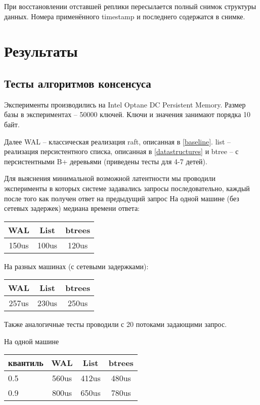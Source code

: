 \documentclass[pdftex,ptm,12pt,a4paper]{report}
\theoremstyle{definition}
\begin{document}
При восстановлении отставшей реплики пересылается полный снимок структуры данных. Номера применённого timestamp и последнего содержатся в снимке.

\chapter{Результаты}
\section{Тесты алгоритмов консенсуса}
Эксперименты производились на Intel Optane DC Persistent Memory.
Размер базы в экспериментах -- 50000 ключей. Ключи и значения занимают порядка 10 байт.

Далее  WAL -- классическая реализация raft, описанная в \ref{baseline}. list -- реализация персистентного списка, описанная в \ref{datastructures}
и btree -- с персистентными B+ деревьями (приведены тесты для 4-7 детей).

Для выяснения минимальной возможной латентности мы проводили эксперименты в которых системе задавались запросы последовательно, каждый после того как получен ответ на предыдущий запрос
На одной машине (без сетевых задержек) медиана времени ответа:
\begin{center}
\begin{tabular} {|c c c|}
\hline
    WAL & List & btrees \\
    \hline
150us & 100us & 120us \\
\hline
\end{tabular}
\end{center}

На разных машинах (с сетевыми задержками):
\begin{center}
\begin{tabular} {|c c c|}
\hline
    WAL & List & btrees \\
    \hline
257us & 230us & 250us \\
\hline
\end{tabular}
\end{center}

Также аналогичные тесты проводили с 20 потоками задающими запрос.

На одной машине

\begin{center}
\begin{tabular} {|l |c c c|}
\hline
квантиль & WAL & List & btrees \\
\hline
0.5 & 560us & 412us & 480us \\
0.9 & 800us & 650us & 780us \\
\hline
\end{tabular}
\end{center}
\end{document}

